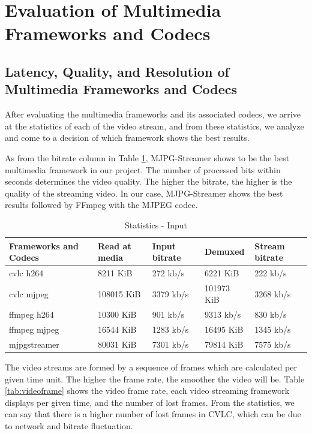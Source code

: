 \section{Evaluation of Multimedia Frameworks and Codecs}
\label{sec:4}

\subsection{Latency, Quality, and Resolution of Multimedia Frameworks and Codecs}

After evaluating the multimedia frameworks and its associated codecs, we arrive at the statistics of each of the video stream, and from these statistics, we analyze and come to a decision of which framework shows the best results. \par

As from the bitrate column in Table \ref{tab:table-stat}, MJPG-Streamer shows to be the best multimedia framework in our project. The number of processed bits within seconds determines the video quality. The higher the bitrate, the higher is the quality of the streaming video. In our case, MJPG-Streamer shows the best results followed by FFmpeg with the MJPEG codec.

\begin{table}[H]
	\begin{center}
	\caption{Statistics - Input}
	\label{tab:table-stat}
	\begin{tabular}{l | l | l | l | l}
		Frameworks and Codecs & Read at media & Input bitrate &  Demuxed & Stream bitrate \\
		\hline \hline
		cvlc h264 & 8211 KiB & 272 kb\slash s & 6221 KiB & 222 kb\slash s \\
		cvlc mjpeg & 108015 KiB & 3379 kb\slash s & 101973 KiB & 3268 kb\slash s \\
		ffmpeg h264 & 10300 KiB & 901 kb\slash s & 9313 kb\slash s & 830 kb\slash s \\
		ffmpeg mjpeg & 16544 KiB & 1283 kb\slash s & 16495 KiB & 1345 kb\slash s \\
		mjpgstreamer & 80031 KiB & 7301 kb\slash s & 79814 KiB & 7575 kb\slash s   
	\end{tabular}
	\end{center}
\end{table}

The video streams are formed by a sequence of frames which are calculated per given time unit. The higher the frame rate, the smoother the video will be. Table \ref{tab:videoframe} shows the video frame rate, each video streaming framework displays per given time, and the number of lost frames. From the statistics, we can say that there is a higher number of lost frames in CVLC, which can be due to network and bitrate fluctuation.

